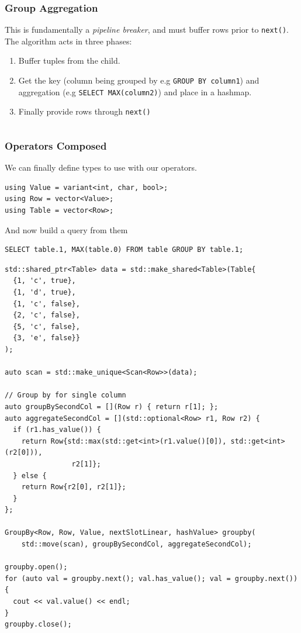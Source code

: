 \subsubsection{Group Aggregation}
This is fundamentally a \textit{pipeline breaker}, and must buffer rows prior to \texttt{next()}.
The algorithm acts in three phases:
\begin{enumerate}
  \item Buffer tuples from the child.
  \item Get the key (column being grouped by e.g \texttt{GROUP BY column1}) and aggregation (e.g \texttt{SELECT MAX(column2)}) and place in a hashmap.
  \item Finally provide rows through \texttt{next()}
\end{enumerate}
\inputminted[firstline=272, lastline=342]{cpp}{processing_models/code/volcano/operators.h}

\subsubsection{Operators Composed}
We can finally define types to use with our operators.
\begin{verbatim}
using Value = variant<int, char, bool>;
using Row = vector<Value>;
using Table = vector<Row>;
\end{verbatim}
And now build a query from them
\begin{verbatim}
SELECT table.1, MAX(table.0) FROM table GROUP BY table.1;
\end{verbatim}
\begin{verbatim}
std::shared_ptr<Table> data = std::make_shared<Table>(Table{
  {1, 'c', true},
  {1, 'd', true},
  {1, 'c', false},
  {2, 'c', false},
  {5, 'c', false},
  {3, 'e', false}}
);

auto scan = std::make_unique<Scan<Row>>(data);

// Group by for single column
auto groupBySecondCol = [](Row r) { return r[1]; };
auto aggregateSecondCol = [](std::optional<Row> r1, Row r2) {
  if (r1.has_value()) {
    return Row{std::max(std::get<int>(r1.value()[0]), std::get<int>(r2[0])),
                r2[1]};
  } else {
    return Row{r2[0], r2[1]};
  }
};

GroupBy<Row, Row, Value, nextSlotLinear, hashValue> groupby(
    std::move(scan), groupBySecondCol, aggregateSecondCol);

groupby.open();
for (auto val = groupby.next(); val.has_value(); val = groupby.next())
{
  cout << val.value() << endl;
}
groupby.close();
\end{verbatim}

